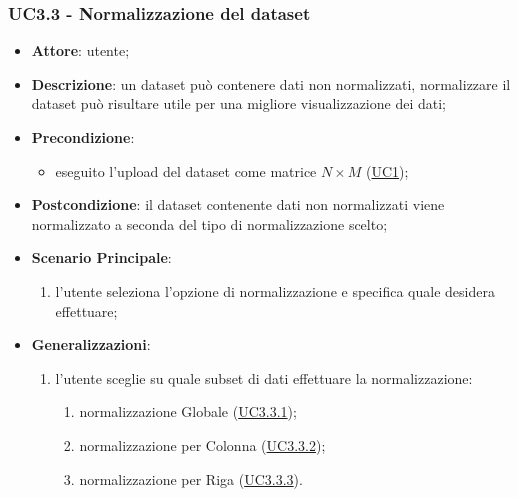     \subsubsection{UC3.3 - Normalizzazione del dataset}
    \label{uc3.3}
    
    \begin{itemize}
    \item \textbf{Attore}: utente;
    \item \textbf{Descrizione}: un dataset può contenere dati non normalizzati, normalizzare il dataset può risultare utile per una migliore visualizzazione dei dati;
    \item \textbf{Precondizione}: 
    \begin{itemize}
        \item eseguito l'upload del dataset come matrice $N\times M$ (\hyperref[uc1]{UC1});
    \end{itemize}  
    \item \textbf{Postcondizione}: il dataset contenente dati non normalizzati viene normalizzato a seconda del tipo di normalizzazione scelto;
    \item \textbf{Scenario Principale}:
    \begin{enumerate}
        \item l'utente seleziona l'opzione di normalizzazione e specifica quale desidera effettuare;
    \end{enumerate}  
    \item \textbf{Generalizzazioni}: 
     \begin{enumerate}
            \item l'utente sceglie su quale subset di dati effettuare la normalizzazione:
                \begin{enumerate}
                    \item normalizzazione Globale (\hyperref[uc3.3.1]{UC3.3.1});
                    \item normalizzazione per Colonna (\hyperref[uc3.3.2]{UC3.3.2});
                    \item normalizzazione per Riga (\hyperref[uc3.3.3]{UC3.3.3}).
                \end{enumerate}
        \end{enumerate}  
    \end{itemize}
    
